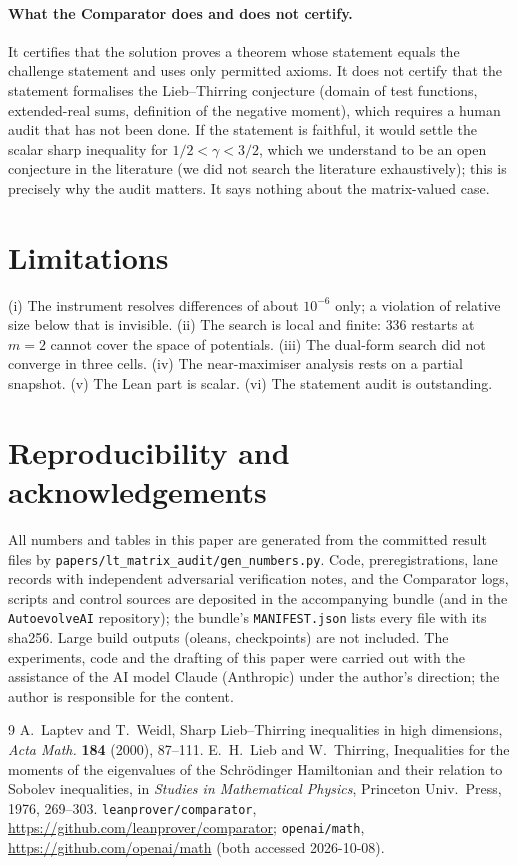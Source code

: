 \documentclass[11pt]{article}
\theoremstyle{remark}
\begin{document}
\paragraph{What the Comparator does and does not certify.} It certifies that the solution proves a theorem whose statement equals the challenge statement and uses only permitted axioms. It does not certify that the statement formalises the Lieb--Thirring conjecture
(domain of test functions, extended-real sums, definition of the negative moment), which requires a human audit that has not been done. If the statement is faithful, it would settle the scalar sharp inequality for $1/2<\gamma<3/2$,
which we understand to be an open conjecture in the literature (we did not search the literature exhaustively); this is precisely why the audit matters. It says nothing about the matrix-valued case.

\section{Limitations}
(i) The instrument resolves differences of about $10^{-6}$ only; a violation of relative size below that is invisible. (ii) The search is local and finite: $336$ restarts at $m=2$ cannot cover the space of potentials.
(iii) The dual-form search did not converge in three cells. (iv) The near-maximiser analysis rests on a partial snapshot. (v) The Lean part is scalar. (vi) The statement audit is outstanding.

\section*{Reproducibility and acknowledgements}
All numbers and tables in this paper are generated from the committed result files by \texttt{papers/lt\_matrix\_audit/gen\_numbers.py}. Code, preregistrations, lane records with independent adversarial verification notes, and the Comparator logs, scripts and control sources are deposited in the accompanying bundle
(and in the \texttt{AutoevolveAI} repository); the bundle's \texttt{MANIFEST.json} lists every file with its sha256. Large build outputs (oleans, checkpoints) are not included. The experiments, code and the drafting of this paper were carried out with the assistance of the AI model Claude (Anthropic) under the author's direction;
the author is responsible for the content.

\begin{thebibliography}{9}
 A.~Laptev and T.~Weidl, Sharp Lieb--Thirring inequalities in high dimensions, \emph{Acta Math.} \textbf{184} (2000), 87--111.
 E.~H.~Lieb and W.~Thirring, Inequalities for the moments of the eigenvalues of the Schr\"odinger Hamiltonian and their relation to Sobolev inequalities, in \emph{Studies in Mathematical Physics}, Princeton Univ.\ Press, 1976, 269--303.
 \texttt{leanprover/comparator}, \url{https://github.com/leanprover/comparator}; \texttt{openai/math}, \url{https://github.com/openai/math} (both accessed 2026-10-08).
\end{thebibliography}
\end{document}
